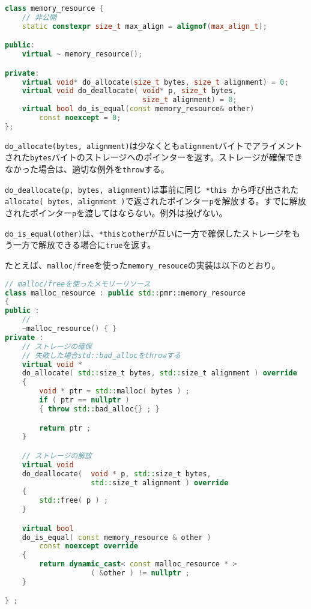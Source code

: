 \begin{lstlisting}[language=C++]
class memory_resource {
    // 非公開
    static constexpr size_t max_align = alignof(max_align_t);

public:
    virtual ~ memory_resource();

private:
    virtual void* do_allocate(size_t bytes, size_t alignment) = 0;
    virtual void do_deallocate( void* p, size_t bytes,
                                size_t alignment) = 0;
    virtual bool do_is_equal(const memory_resource& other)
        const noexcept = 0;
};
\end{lstlisting}

\lstinline!do_allocate(bytes, alignment)!は少なくとも\lstinline!alignment!バイトでアライメントされた\lstinline!bytes!バイトのストレージへのポインターを返す。ストレージが確保できなかった場合は、適切な例外を\lstinline!throw!する。

\lstinline!do_deallocate(p, bytes, alignment)!は事前に同じ~\lstinline!*this!~から呼び出された\lstinline!allocate( bytes, alignment )!で返されたポインター\lstinline!p!を解放する。すでに解放されたポインター\lstinline!p!を渡してはならない。例外は投げない。

\lstinline!do_is_equal(other)!は、\lstinline!*thisとother!が互いに一方で確保したストレージをもう一方で解放できる場合に\lstinline!true!を返す。

たとえば、\lstinline!malloc!/\lstinline!free!を使った\lstinline!memory_resouce!の実装は以下のとおり。

\begin{lstlisting}[language=C++]
// malloc/freeを使ったメモリーリソース
class malloc_resource : public std::pmr::memory_resource
{
public :
    //
    ~malloc_resource() { }
private :
    // ストレージの確保
    // 失敗した場合std::bad_allocをthrowする
    virtual void * 
    do_allocate( std::size_t bytes, std::size_t alignment ) override
    {
        void * ptr = std::malloc( bytes ) ;
        if ( ptr == nullptr )
        { throw std::bad_alloc{} ; }

        return ptr ;
    }

    // ストレージの解放
    virtual void 
    do_deallocate(  void * p, std::size_t bytes, 
                    std::size_t alignment ) override
    {
        std::free( p ) ;
    }

    virtual bool 
    do_is_equal( const memory_resource & other )
        const noexcept override
    {
        return dynamic_cast< const malloc_resource * >
                    ( &other ) != nullptr ;
    }

} ;
\end{lstlisting}

